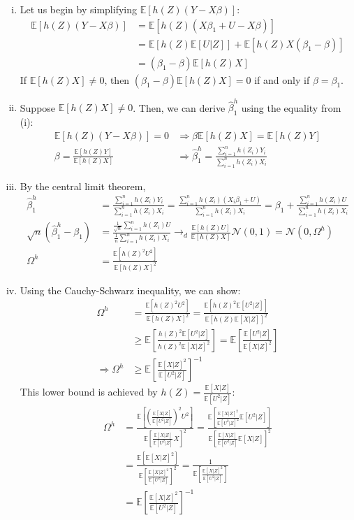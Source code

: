 \documentclass{article}
\newcommand{\N}{\mathcal{N}}
\newcommand{\sumn}{\sum_{i=1}^{n}}
\newcommand{\bhat}{\hat{\beta}}
\newcommand{\E}[1]{\mathbb{E}\left[#1\right]}%
\begin{document}
\begin{enumerate}[(i)]
	\item Let us begin by simplifying $\E{h(Z)(Y-X\beta)}$:
		\begin{align*}
			\E{h(Z)(Y-X\beta)} 	&= \E{h(Z)\left(X\beta_1 + U - X\beta\right)}	\\
								&= \E{h(Z)\E{U|Z}} + \E{h(Z)X(\beta_1-\beta)}	\\
								&= (\beta_1 - \beta)\E{h(Z)X}
		\end{align*}
		If $\E{h(Z)X}\neq0$, then ${(\beta_1 - \beta)\E{h(Z)X}=0}$ if and only if ${\beta=\beta_1}$.
	
	
	\item Suppose ${\E{h(Z)X}\neq0}$. Then, we can derive $\bhat^h_1$ using the equality from (i):
		\begin{align*}
				\E{h(Z)(Y-X\beta)} = 0				&\Rightarrow \beta\E{h(Z)X} = \E{h(Z)Y}									\\
				\beta = \frac{\E{h(Z)Y}}{\E{h(Z)X}} &\Rightarrow \bhat^h_1 = \frac{\sum_{i=1}^n h(Z_i)Y_i}{\sumn h(Z_i)X_i}
		\end{align*}
	
	
	\item By the central limit theorem,
		\begin{align*}
										\bhat^h_1	&= 				\frac{\sum_{i=1}^n h(Z_i)Y_i}{\sumn h(Z_i)X_i}								
													= 				\frac{\sum_{i=1}^n h(Z_i)(X_i\beta_1 + U)}{\sumn h(Z_i)X_i}					
													= 				\beta_1 + \frac{\sum_{i=1}^n h(Z_i)U}{\sumn h(Z_i)X_i}						\\
			\sqrt{n}\left(\bhat^h_1-\beta_1\right)	&= 				\frac{\frac{1}{\sqrt{n}}\sum_{i=1}^n h(Z_i)U}{\frac{1}{n}\sumn h(Z_i)X_i}	
													\rightarrow_d 	\frac{\E{h(Z)U}}{\E{h(Z)X}}\N(0,1)																		
													=				\N\left(0,\Omega^h\right)													\\
										\Omega^h 	&= 				\frac{\E{h(Z)^2U^2}}{\E{h(Z)X}^2}
		\end{align*}
	
	
	\item Using the Cauchy-Schwarz inequality, we can show:
		\begin{align*}
			\Omega^h 	&= 		\frac{\E{h(Z)^2U^2}}{\E{h(Z)X}^2} 			= \frac{\E{h(Z)^2\E{U^2|Z}}}{\E{h(Z)\E{X|Z}}^2}	\\
						&\geq 	\E{\frac{h(Z)^2\E{U^2|Z}}{h(Z)^2\E{X|Z}^2}} = \E{\frac{\E{U^2|Z}}{\E{X|Z}^2}}				\\
	\Rightarrow\Omega^h	&\geq 	\E{\frac{\E{X|Z}^2}{\E{U^2|Z}}}^{-1}
		\end{align*}
		This lower bound is achieved by ${h(Z) = \frac{\E{X|Z}}{\E{U^2|Z}}}$:
		\begin{align*}
			\Omega^h 	&= \frac{\E{ \left(\frac{\E{X|Z}}{\E{U^2|Z}}\right)^2U^2}}{\E{ \frac{\E{X|Z}}{\E{U^2|Z}}X}^2} 
							= \frac{\E{\frac{\E{X|Z}^2}{\E{U^2|Z}^2}\E{U^2|Z}}}{\E{\frac{\E{X|Z}}{\E{U^2|Z}}\E{X|Z}}^2} 	\\
						&= \frac{\E{\E{X|Z}^2}}{\E{\frac{\E{X|Z}^2}{\E{U^2|Z}}}^2} 
							= \frac{1}{\E{\frac{\E{X|Z}^2}{\E{U^2|Z}}}} 													\\
						&= \E{\frac{\E{X|Z}^2}{\E{U^2|Z}}}^{-1}
		\end{align*}
	

\end{enumerate}
\end{document}
